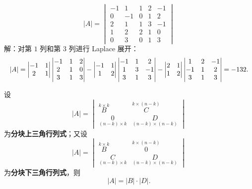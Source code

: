 \begin{example}
\[
|A|=\begin{vmatrix}
-1 & 1 & 1 & 2 & -1\\
0 & -1 & 0 & 1 & 2\\
2 & 1 & 1 & 3 & -1\\
1 & 2 & 2 & 1 & 0\\
0 & 3 & 0 & 1 & 3
\end{vmatrix}
\]
解：对第 $1$ 列和第 $3$ 列进行 Laplace 展开：
\[
\resizebox{\ifdim\width>\linewidth\linewidth\else\width\fi}{!}{$\displaystyle
|A|=
\begin{vmatrix} -1 & 1\\ 2 & 1\end{vmatrix}
\begin{vmatrix} -1 & 1 & 2\\ 2 & 1 & 0\\ 3 & 1 & 3\end{vmatrix}
-\begin{vmatrix} -1 & 1\\ 1 & 2\end{vmatrix}
\begin{vmatrix} -1 & 1 & 2\\ 1 & 3 & -1\\ 3 & 1 & 3\end{vmatrix}
-\begin{vmatrix} 2 & 1\\ 1 & 2\end{vmatrix}
\begin{vmatrix} 1 & 2 & -1\\ -1 & 1 & 2\\ 3 & 1 & 3\end{vmatrix}
=-132.$}
\]
\end{example}

\begin{corollary}
设
\[
|A|=\begin{vmatrix}
\overset{\scriptscriptstyle k\times k}{B} & \overset{\scriptscriptstyle k\times(n-k)}{C}\\[2pt]
\underset{\scriptscriptstyle (n-k)\times k}{0} & \underset{\scriptscriptstyle (n-k)\times(n-k)}{D}
\end{vmatrix}
\]
为\textbf{分块上三角行列式}；又设
\[
|A|=\begin{vmatrix}
\overset{\scriptscriptstyle k\times k}{B} & \overset{\scriptscriptstyle k\times(n-k)}{0}\\[2pt]
\underset{\scriptscriptstyle (n-k)\times k}{C} & \underset{\scriptscriptstyle (n-k)\times(n-k)}{D}
\end{vmatrix}
\]
为\textbf{分块下三角行列式}，则
\[
|A|=|B|\cdot|D|.
\]
\end{corollary}

